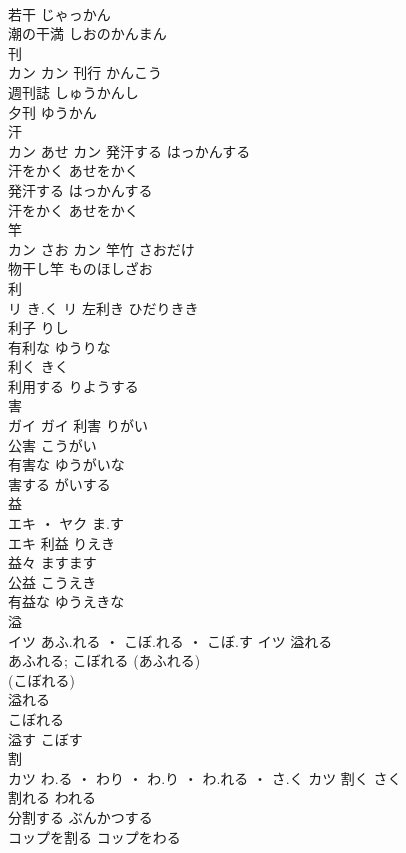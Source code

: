 \documentclass[8pt]{extreport}
\begin{document}
\begin{CJK}{UTF8}{min}
\\	若干	じゃっかん	
\\	潮の干満	しおのかんまん	
\\	刊	
\\	カン		カン	刊行	かんこう	
\\	週刊誌	しゅうかんし	
\\	夕刊	ゆうかん	
\\	汗	
\\	カン	あせ	カン	発汗する	はっかんする	
\\	汗をかく	あせをかく	
\\	発汗する	はっかんする	
\\	汗をかく	あせをかく	
\\	竿	
\\	カン	さお	カン	竿竹	さおだけ	
\\	物干し竿	ものほしざお	
\\	利	
\\	リ	き.く	リ	左利き	ひだりきき	
\\	利子	りし	
\\	有利な	ゆうりな	
\\	利く	きく	
\\	利用する	りようする	
\\	害	
\\	ガイ		ガイ	利害	りがい	
\\	公害	こうがい	
\\	有害な	ゆうがいな	
\\	害する	がいする	
\\	益	
\\	エキ ・ ヤク	ま.す
\\	エキ	利益	りえき	
\\	益々	ますます	
\\	公益	こうえき	
\\	有益な	ゆうえきな	
\\	溢	
\\	イツ	あふ.れる ・ こぼ.れる ・ こぼ.す	イツ	溢れる 
\\	あふれる; こぼれる	(あふれる) 
\\	(こぼれる) 
\\	溢れる 
\\	こぼれる	
\\	溢す	こぼす	
\\	割	
\\	カツ	わ.る ・ わり ・ わ.り ・ わ.れる ・ さ.く	カツ	割く	さく	
\\	割れる	われる	
\\	分割する	ぶんかつする	
\\	コップを割る	コップをわる	

\end{CJK}
\end{document}
